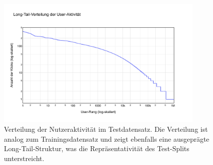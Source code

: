 
\begin{figure}[htbp]
    \centering
    \includegraphics[width=0.9\textwidth]{content/figures/svg/nutzer_verteilung_test.pdf}
    \caption{Verteilung der Nutzeraktivität im Testdatensatz. Die Verteilung ist analog zum Trainingsdatensatz und zeigt ebenfalls eine ausgeprägte Long-Tail-Struktur, was die Repräsentativität des Test-Splits unterstreicht.}
    \label{fig:nutzerverteilung_test}
\end{figure}